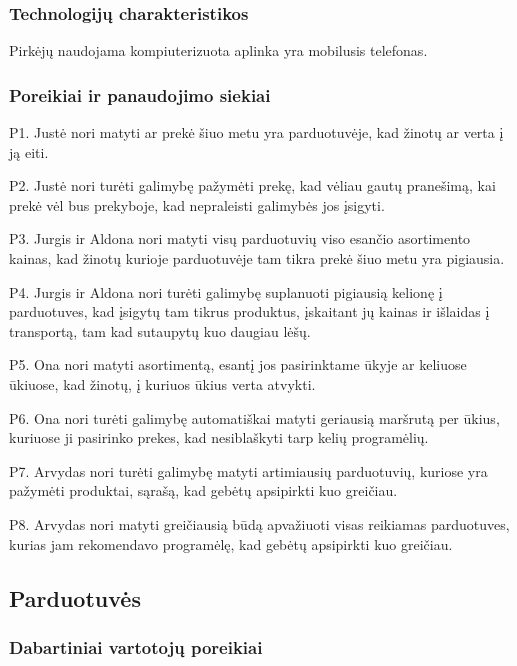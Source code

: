 \documentclass{article}
\begin{document}
\subsubsection*{Technologijų charakteristikos}
	Pirkėjų naudojama kompiuterizuota aplinka yra mobilusis telefonas.\par
	\pagebreak

\subsubsection{Poreikiai ir panaudojimo siekiai}
	P1. Justė nori matyti ar prekė šiuo metu yra parduotuvėje, kad žinotų ar verta į ją eiti.\par
	P2. Justė nori turėti galimybę pažymėti prekę, kad vėliau gautų pranešimą, kai prekė vėl bus prekyboje, kad nepraleisti galimybės jos įsigyti.\par
	P3. Jurgis ir Aldona nori matyti visų parduotuvių viso esančio asortimento kainas, kad žinotų kurioje parduotuvėje tam tikra prekė šiuo metu yra pigiausia.\par
	P4. Jurgis ir Aldona nori turėti galimybę suplanuoti pigiausią kelionę į parduotuves, kad įsigytų tam tikrus produktus, įskaitant jų kainas ir išlaidas į transportą, tam kad sutaupytų kuo daugiau lėšų.\par
	P5. Ona nori matyti asortimentą, esantį jos pasirinktame ūkyje ar keliuose ūkiuose, kad žinotų, į kuriuos ūkius verta atvykti.\par
	P6. Ona nori turėti galimybę automatiškai matyti geriausią maršrutą per ūkius, kuriuose ji pasirinko prekes, kad nesiblaškyti tarp kelių programėlių.\par
	P7. Arvydas nori turėti galimybę matyti artimiausių parduotuvių, kuriose yra pažymėti produktai, sąrašą, kad gebėtų apsipirkti kuo greičiau.\par
	P8. Arvydas nori matyti greičiausią būdą apvažiuoti visas reikiamas parduotuves, kurias jam rekomendavo programėlę, kad gebėtų apsipirkti kuo greičiau.
	\pagebreak

\subsection{Parduotuvės}
\subsubsection{Dabartiniai vartotojų poreikiai}
\end{document}
